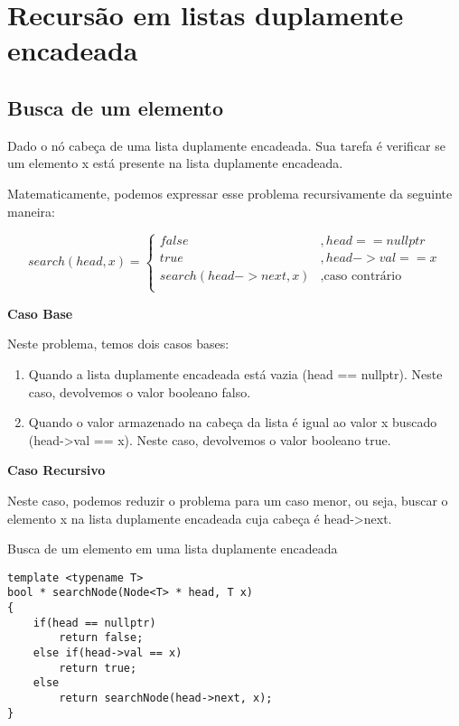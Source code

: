 \section{Recursão em listas duplamente encadeada}

\subsection{Busca de um elemento}
Dado o nó cabeça de uma lista duplamente encadeada. Sua tarefa é
verificar se um elemento x está presente na lista duplamente encadeada.

Matematicamente, podemos expressar esse problema recursivamente da seguinte maneira:


\begin{equation}
search(head, x) = 
\begin{cases}
false           & , head == nullptr\\
true            & , head->val == x\\
search(head->next, x) & , \text{caso contrário}\\

\end{cases}
\end{equation}

\textbf{Caso Base}

Neste problema, temos dois casos bases:

\begin{enumerate}
    \item Quando a lista duplamente encadeada está vazia (head == nullptr). Neste caso, devolvemos o valor booleano falso.
    \item Quando o valor armazenado na cabeça da lista é igual ao valor x buscado (head->val == x). Neste caso, devolvemos o valor booleano true. 
\end{enumerate}


\textbf{Caso Recursivo}

Neste caso, podemos reduzir o problema para um caso menor, ou seja, buscar o elemento x na lista duplamente encadeada cuja cabeça é head->next.


\begin{listing}[!ht]
\caption{Busca de um elemento em uma lista duplamente encadeada}
\label{listing::DeleteNodeDouble}
\begin{verbatim}
template <typename T>
bool * searchNode(Node<T> * head, T x)
{
    if(head == nullptr)
        return false;
    else if(head->val == x)
        return true;
    else   
        return searchNode(head->next, x);
}
\end{verbatim}
\end{listing}


